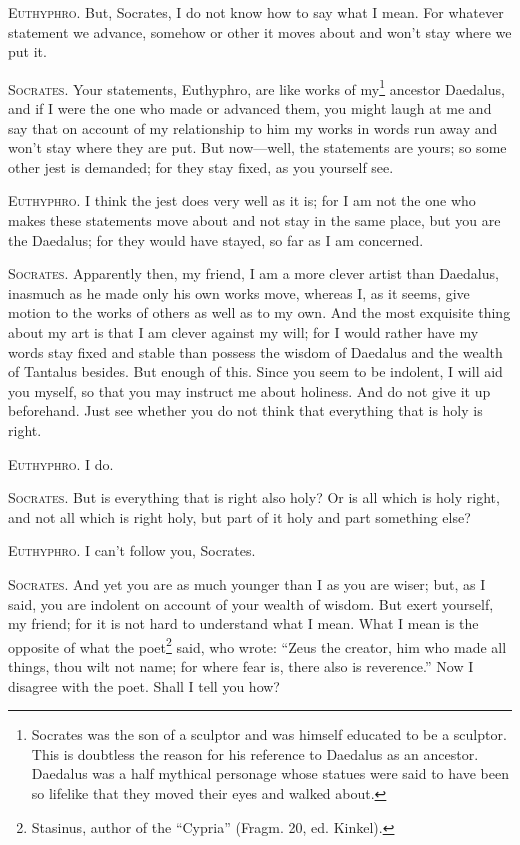\textsc{Euthyphro}. But, Socrates, I do not know how to say what I
mean. For whatever statement we advance, somehow or other it moves
about and won't stay where we put it.

\textsc{Socrates}. Your statements, Euthyphro, are like works of
my\footnote{Socrates was the son of a sculptor and was himself
educated to be a sculptor. This is doubtless the reason for his
reference to Daedalus as an ancestor. Daedalus was a half mythical
personage whose statues were said to have been so lifelike that they
moved their eyes and walked about.} ancestor Daedalus, and if I were
the one who made or advanced them, you might laugh at me and say that
on account of my relationship to him my works in words run away and
won't stay where they are put. But now---well, the statements are
yours; so some other jest is demanded; for they stay fixed, as you
yourself see.

\textsc{Euthyphro}. I think the jest does very well as it 
is; for I am not the one who makes these statements move about and not
stay in the same place, but you are the Daedalus; for they would have
stayed, so far as I am concerned.

\textsc{Socrates}. Apparently then, my friend, I am a more clever
artist than Daedalus, inasmuch as he made only his own works move,
whereas I, as it seems, give motion to the works of others as well as
to my own. And the most exquisite thing about my art is that I am
clever against my will; for I would rather have my words stay fixed
and stable than possess the wisdom of Daedalus and the wealth of
Tantalus besides. But enough of this. Since you seem to be indolent, I
will aid you myself, so that you may instruct me about holiness. And
do not give it up beforehand. Just see whether you do not think that
everything that is holy is right.

\textsc{Euthyphro}. I do.

\textsc{Socrates}. But is everything that is right also holy? Or is
all which is holy right, and not all which is right holy, but part of
it holy and part something else?

\textsc{Euthyphro}. I can't follow you, Socrates.

\textsc{Socrates}. And yet you are as much younger than I as you are
wiser; but, as I said, you are indolent on account of your wealth of
wisdom. But exert  yourself, my friend; for it is not hard to
understand what I mean. What I mean is the opposite of what the
poet\footnote{Stasinus, author of the ``Cypria'' (Fragm. 20, ed.
Kinkel).} said, who wrote: ``Zeus the creator, him who made all
things, thou wilt not name; for where fear is, there also is
reverence.'' Now I disagree with the poet. Shall I tell you how?

